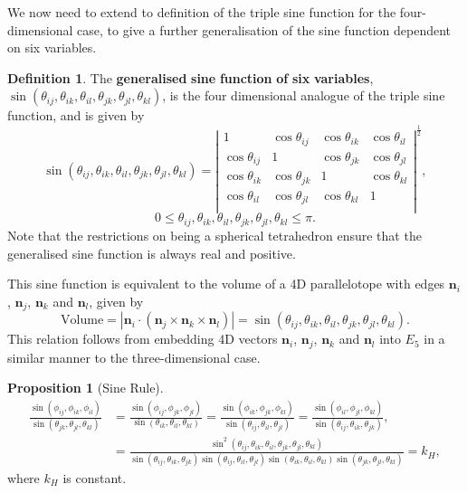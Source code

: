 \documentclass[fleqn,11pt,twoside]{article}
\theoremstyle{definition}
\newtheorem{prop}{Proposition}
\newtheorem{defn}{Definition}
\begin{document}
We now need to extend to definition of the triple sine function for the four-dimensional case, to give a further generalisation of the sine function dependent on six variables.
\begin{defn}
The \textbf{generalised} \textbf{sine} \textbf{function} \textbf{of} \textbf{six} \textbf{variables}, $\sin(\theta_{ij},\theta_{ik},\theta_{il},\theta_{jk},\theta_{jl},\theta_{kl})$, is the four dimensional analogue of the triple sine function, and is given by
\begin{equation}
\sin(\theta_{ij},\theta_{ik},\theta_{il},\theta_{jk},\theta_{jl},\theta_{kl})=\left|\begin{array}{cccc}
1&
\cos\theta_{ij}&
\cos\theta_{ik}&
\cos\theta_{il}\\
\cos\theta_{ij}&
1&
\cos\theta_{jk}&
\cos\theta_{jl}\\
\cos\theta_{ik}&
\cos\theta_{jk}&
1&
\cos\theta_{kl}\\
\cos\theta_{il}&
\cos\theta_{jl}&
\cos\theta_{kl}&
1\\
\end{array}\right|^{\frac{1}{2}},\end{equation}
\begin{equation}
0\leq\theta_{ij},\theta_{ik},\theta_{il},\theta_{jk},\theta_{jl},\theta_{kl}\leq\pi.
\end{equation}
Note that the restrictions on being a spherical tetrahedron ensure that the generalised sine function is always real and positive.
\end{defn}
This sine function is equivalent to the volume of a 4D parallelotope with edges $\mathbf{n}_i$, $\mathbf{n}_j$, $\mathbf{n}_k$ and $\mathbf{n}_l$, given by
\begin{equation}
\text{Volume}=|\textbf{n}_i\cdot(\textbf{n}_j\times\textbf{n}_k\times\textbf{n}_l)|=\sin(\theta_{ij},\theta_{ik},\theta_{il},\theta_{jk},\theta_{jl},\theta_{kl}).
\end{equation}
This relation follows from embedding 4D vectors $\mathbf{n}_i$, $\mathbf{n}_j$, $\mathbf{n}_k$ and $\mathbf{n}_l$ into $E_5$ in a similar manner to the three-dimensional case.

\begin{prop}[Sine Rule]
\begin{equation}\label{eq:sin}
\begin{split}
\frac{\sin(\phi_{ij},\phi_{ik},\phi_{il})}{\sin(\theta_{jk},\theta_{jl},\theta_{kl})}
&=\frac{\sin(\phi_{ij},\phi_{jk},\phi_{jl})}{\sin(\theta_{ik},\theta_{il},\theta_{kl})}
=\frac{\sin(\phi_{ik},\phi_{jk},\phi_{kl})}{\sin(\theta_{ij},\theta_{il},\theta_{jl})}
=\frac{\sin(\phi_{il},\phi_{jl},\phi_{kl})}{\sin(\theta_{ij},\theta_{ik},\theta_{jk})},\\
&=\frac{\sin^2(\theta_{ij},\theta_{ik},\theta_{il},\theta_{jk},\theta_{jl},\theta_{kl})}{\sin(\theta_{ij},\theta_{ik},\theta_{jk})\sin(\theta_{ij},\theta_{il},\theta_{jl})\sin(\theta_{ik},\theta_{il},\theta_{kl})\sin(\theta_{jk},\theta_{jl},\theta_{kl})}=k_H,
\end{split}
\end{equation}
where $k_H$ is constant.
\end{prop}
\end{document}

